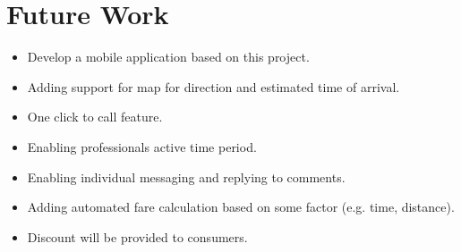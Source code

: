 \clearpage

\section{Future Work}
\begin{itemize}
\item Develop a mobile application based on this project.
\item Adding support for map for direction and estimated time of arrival.
\item One click to call feature.
\item Enabling professionals active time period.
\item Enabling individual messaging and replying to comments.
\item Adding automated fare calculation based on some factor (e.g. time, distance).
\item Discount will be provided to consumers.
\end{itemize}

\clearpage



